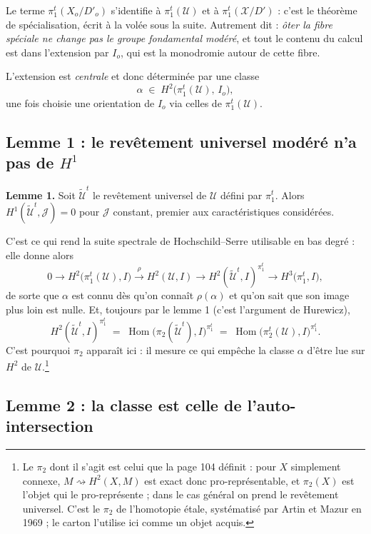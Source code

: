 \documentclass[11pt,a4paper]{article}
\begin{document}
Le terme $\pi_{1}^{t}(X_{o}/D'_{o})$ s'identifie à $\pi_{1}^{t}(\mathcal{U})$
et à $\pi_{1}^{t}(\mathcal{X}/D')$ : c'est le théorème de spécialisation, écrit
à la volée sous la suite. Autrement dit : \emph{ôter la fibre spéciale ne change
pas le groupe fondamental modéré}, et tout le contenu du calcul est dans
l'extension par $I_{o}$, qui est la monodromie autour de cette fibre.

L'extension est \emph{centrale} et donc déterminée par une classe
\[
  \alpha \;\in\; H^{2}\bigl(\pi_{1}^{t}(\mathcal{U}),\, I_{o}\bigr) ,
\]
une fois choisie une orientation de $I_{o}$ via celles de
$\pi_{1}^{t}(\mathcal{U})$.

\subsection*{Lemme 1 : le revêtement universel modéré n'a pas de $H^{1}$}

\textbf{Lemme 1.} Soit $\tilde{\mathcal{U}}^{t}$ le revêtement universel de
$\mathcal{U}$ défini par $\pi_{1}^{t}$. Alors
$H^{1}(\tilde{\mathcal{U}}^{t}, \mathcal{J}) = 0$ pour $\mathcal{J}$ constant,
premier aux caractéristiques considérées.

C'est ce qui rend la suite spectrale de Hochschild--Serre utilisable en bas
degré : elle donne alors
\[
  0 \to H^{2}\bigl(\pi_{1}^{t}(\mathcal{U}), I\bigr)
  \xrightarrow{\ \rho\ } H^{2}(\mathcal{U}, I) \to
  H^{2}(\tilde{\mathcal{U}}^{t}, I)^{\pi_{1}^{t}} \to
  H^{3}\bigl(\pi_{1}^{t}, I\bigr) ,
\]
de sorte que $\alpha$ est connu dès qu'on connaît $\rho(\alpha)$ et qu'on sait
que son image plus loin est nulle. Et, toujours par le lemme 1 (c'est
l'argument de Hurewicz),
\[
  H^{2}(\tilde{\mathcal{U}}^{t}, I)^{\pi_{1}^{t}} \;=\;
  \operatorname{Hom}\bigl(\pi_{2}(\tilde{\mathcal{U}}^{t}), I\bigr)^{\pi_{1}^{t}}
  \;=\; \operatorname{Hom}\bigl(\pi_{2}^{t}(\mathcal{U}), I\bigr)^{\pi_{1}^{t}} .
\]
C'est pourquoi $\pi_{2}$ apparaît ici : il mesure ce qui empêche la
classe $\alpha$ d'être lue sur $H^{2}$ de $\mathcal{U}$.\footnote{Le
$\pi_{2}$ dont il s'agit est celui que la page 104 définit :
pour $X$ simplement connexe, $M \rightsquigarrow H^{2}(X,M)$ est exact donc
pro-représentable, et $\pi_{2}(X) $ est l'objet qui le pro-représente ; dans le
cas général on prend le revêtement universel. C'est le $\pi_{2}$ de l'homotopie
étale, systématisé par Artin et Mazur en 1969 ; le carton l'utilise ici comme
un objet acquis.}

\subsection*{Lemme 2 : la classe est celle de l'auto-intersection}
\end{document}

